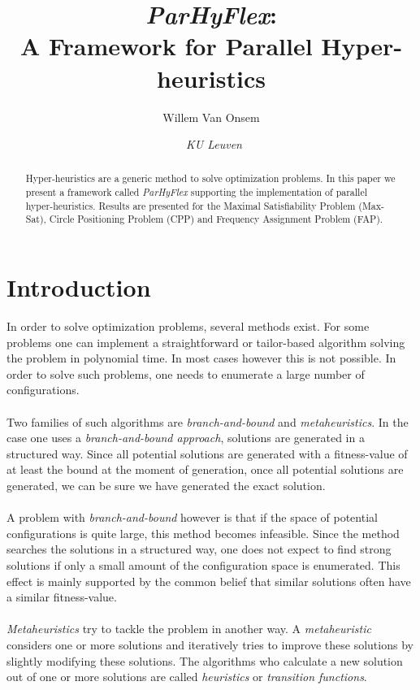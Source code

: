 \documentclass[a4paper,10pt]{article}
\title{\emph{ParHyFlex}:\\A Framework for Parallel Hyper-heuristics}
\author{Willem Van Onsem \affila}
\date{\affila\ \textit{KU Leuven}}%
\newcommand{\seclab}[1]{\label{sec:#1}}
\theoremstyle{definition}
\begin{document}
\ttl
\thispagestyle{empty}


\begin{abstract}
\noindent
Hyper-heuristics are a generic method to solve optimization problems. In this paper we present a framework called \emph{ParHyFlex} supporting the implementation of parallel hyper-heuristics. Results are presented for the Maximal Satisfiability Problem (Max-Sat), Circle Positioning Problem (CPP) and Frequency Assignment Problem (FAP).
\end{abstract}

\section{Introduction}
\seclab{hyper-heuristics}
In order to solve optimization problems, several methods exist. For some problems one can implement a straightforward or tailor-based algorithm solving the problem in polynomial time. In most cases however this is not possible. In order to solve such problems, one needs to enumerate a large number of configurations.

\paragraph{}
Two families of such algorithms are \emph{branch-and-bound} and \emph{metaheuristics}. In the case one uses a \emph{branch-and-bound approach}, solutions are generated in a structured way. Since all potential solutions are generated with a fitness-value of at least the bound at the moment of generation, once all potential solutions are generated, we can be sure we have generated the exact solution.

\paragraph{}
A problem with \emph{branch-and-bound} however is that if the space of potential configurations is quite large, this method becomes infeasible. Since the method searches the solutions in a structured way, one does not expect to find strong solutions if only a small amount of the configuration space is enumerated. This effect is mainly supported by the common belief that similar solutions often have a similar fitness-value.

\paragraph{}
\emph{Metaheuristics} try to tackle the problem in another way. A \emph{metaheuristic} considers one or more solutions and iteratively tries to improve these solutions by slightly modifying these solutions. The algorithms who calculate a new solution out of one or more solutions are called \emph{heuristics} or \emph{transition functions}.
\end{document}
